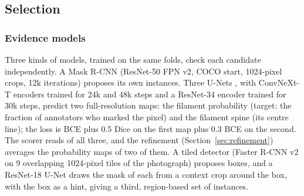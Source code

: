 \documentclass[sigconf]{acmart}
\begin{document}
\subsection{Selection}\label{sec:selection}

\subsubsection{Evidence models}\label{sec:evidence}
Three kinds of models, trained on the same folds, check each candidate independently. A Mask R-CNN \cite{he2017maskrcnn} (ResNet-50 FPN v2, COCO start, 1024-pixel crops, 12k iterations) proposes its own instances. Three U-Nets \cite{ronneberger2015unet}, with ConvNeXt-T \cite{liu2022convnext} encoders trained for 24k and 48k steps and a ResNet-34 \cite{he2016resnet} encoder trained for 30k steps, predict two full-resolution maps: the filament probability (target: the fraction of annotators who marked the pixel) and the filament spine (its centre line); the loss is BCE plus 0.5 Dice on the first map plus 0.3 BCE on the second. The scorer reads  of all three, and the refinement (Section~\ref{sec:refinement}) averages the probability maps of two of them. A tiled detector (Faster R-CNN v2 \cite{ren2015faster} on 9 overlapping 1024-pixel tiles of the photograph) proposes boxes, and a ResNet-18 U-Net draws the mask of each from a context crop around the box, with the box as a hint, giving a third, region-based set of instances.
\end{document}
